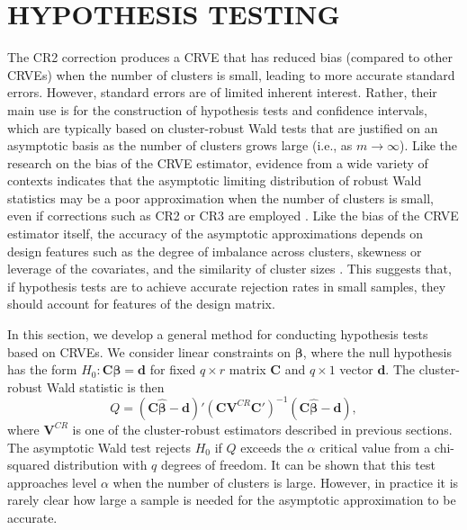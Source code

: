 \documentclass[12pt]{article}\usepackage[]{graphicx}\usepackage[]{color}
\newcommand{\bm}{\mathbf}
\newcommand{\bs}{\boldsymbol}
\begin{document}

\section{HYPOTHESIS TESTING}
\label{sec:testing}

The CR2 correction produces a CRVE that has reduced bias (compared to other CRVEs) when the number of clusters is small, leading to more accurate standard errors. However, standard errors are of limited inherent interest. Rather, their main use is for the construction of hypothesis tests and confidence intervals, which are typically based on cluster-robust Wald tests that are justified on an asymptotic basis as the number of clusters grows large (i.e., as $m \to \infty$). 
Like the research on the bias of the CRVE estimator, evidence from a wide variety of contexts indicates that the asymptotic limiting distribution of robust Wald statistics may be a poor approximation when the number of clusters is small, even if corrections such as CR2 or CR3 are employed \citep{Bell2002bias, Bertrand2004how, Cameron2008bootstrap}. 
Like the bias of the CRVE estimator itself, the accuracy of the asymptotic approximations depends on design features such as the degree of imbalance across clusters, skewness or leverage of the covariates, and the similarity of cluster sizes \citep[][]{McCaffrey2001generalizations, Webb2013wild, Carter2013asymptotic}. 
This suggests that, if hypothesis tests are to achieve accurate rejection rates in small samples, they should account for features of the design matrix.

In this section, we develop a general method for conducting hypothesis tests based on CRVEs. We consider linear constraints on $\bs\beta$, where the null hypothesis has the form $H_0: \bm{C}\bs\beta = \bm{d}$ for fixed $q \times r$ matrix $\bm{C}$ and $q \times 1$ vector $\bm{d}$. 
The cluster-robust Wald statistic is then
\begin{equation}
\label{eq:Wald_stat}
Q = \left(\bm{C}\bs{\hat\beta} - \bm{d}\right)'\left(\bm{C} \bm{V}^{CR} \bm{C}'\right)^{-1}\left(\bm{C}\bs{\hat\beta} - \bm{d}\right),
\end{equation}
where $\bm{V}^{CR}$ is one of the cluster-robust estimators described in previous sections. 
The asymptotic Wald test rejects $H_0$ if $Q$ exceeds the $\alpha$ critical value from a chi-squared distribution with $q$ degrees of freedom. 
It can be shown that this test approaches level $\alpha$ when the number of clusters is large. 
However, in practice it is rarely clear how large a sample is needed for the asymptotic approximation to be accurate. 
\end{document}

